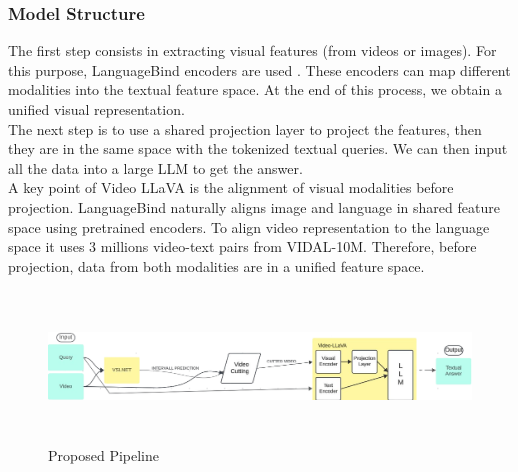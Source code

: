 \documentclass[conference]{IEEEtran}
\begin{document}
\subsubsection{Model Structure}
The first step consists in extracting visual features (from videos or images). For this purpose, LanguageBind encoders are used \cite{b9}. These encoders can map different modalities into the textual feature space. At the end of this process, we obtain a unified visual representation.\\ 
The next step is to use a shared projection layer to project the features, then they are in the same space with the tokenized textual queries. We can then input all the data into a large LLM to get the answer.\\
A key point of Video LLaVA is the alignment of visual modalities before projection. LanguageBind naturally aligns image and language in shared feature space using pretrained encoders. To align video representation to the language space it uses 3 millions video-text pairs from VIDAL-10M\cite{b9}. Therefore, before projection, data from both modalities are in a unified feature space.

\begin{figure}
  \includegraphics[width=\textwidth,height=4cm]{ProposedPipeLine-removebg-preview.png}
  \caption{Proposed Pipeline}
  \label{fig:fullPipeline}
\end{figure}
\end{document}
